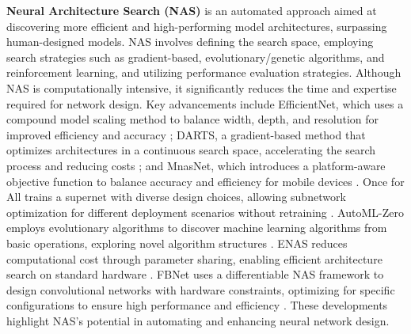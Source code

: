 \documentclass[preprint,12pt]{elsarticle}
\begin{document}
\textbf{Neural Architecture Search (NAS)} \cite{nas} is an automated approach aimed at discovering more efficient and high-performing model architectures, surpassing human-designed models. NAS involves defining the search space, employing search strategies such as gradient-based, evolutionary/genetic algorithms, and reinforcement learning, and utilizing performance evaluation strategies. Although NAS is computationally intensive, it significantly reduces the time and expertise required for network design. Key advancements include EfficientNet, which uses a compound model scaling method to balance width, depth, and resolution for improved efficiency and accuracy \cite{efficientnet}; DARTS, a gradient-based method that optimizes architectures in a continuous search space, accelerating the search process and reducing costs \cite{darts}; and MnasNet, which introduces a platform-aware objective function to balance accuracy and efficiency for mobile devices \cite{mnasnet}. Once for All trains a supernet with diverse design choices, allowing subnetwork optimization for different deployment scenarios without retraining \cite{once}. AutoML-Zero employs evolutionary algorithms to discover machine learning algorithms from basic operations, exploring novel algorithm structures \cite{automlz}. ENAS reduces computational cost through parameter sharing, enabling efficient architecture search on standard hardware \cite{enas}. FBNet uses a differentiable NAS framework to design convolutional networks with hardware constraints, optimizing for specific configurations to ensure high performance and efficiency \cite{fbnet}. These developments highlight NAS's potential in automating and enhancing neural network design.
\end{document}
